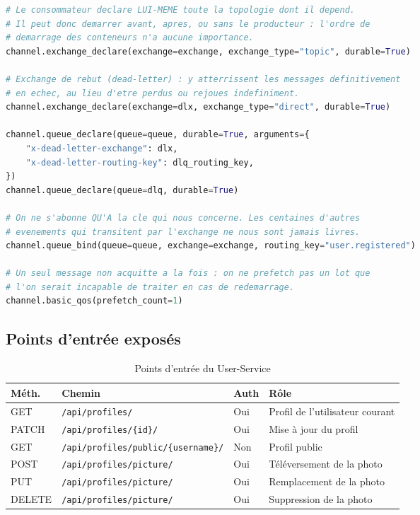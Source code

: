 \documentclass[11pt,a4paper,oneside]{report}
\newcommand{\code}[1]{\texttt{\small #1}}
\begin{document}
\begin{lstlisting}[language=Python, caption={\code{profiles/management/commands/consume\_events.py} — déclaration de la topologie et du rebut}]
# Le consommateur declare LUI-MEME toute la topologie dont il depend.
# Il peut donc demarrer avant, apres, ou sans le producteur : l'ordre de
# demarrage des conteneurs n'a aucune importance.
channel.exchange_declare(exchange=exchange, exchange_type="topic", durable=True)

# Exchange de rebut (dead-letter) : y atterrissent les messages definitivement
# en echec, au lieu d'etre perdus ou rejoues indefiniment.
channel.exchange_declare(exchange=dlx, exchange_type="direct", durable=True)

channel.queue_declare(queue=queue, durable=True, arguments={
    "x-dead-letter-exchange": dlx,
    "x-dead-letter-routing-key": dlq_routing_key,
})
channel.queue_declare(queue=dlq, durable=True)

# On ne s'abonne QU'A la cle qui nous concerne. Les centaines d'autres
# evenements qui transitent par l'exchange ne nous sont jamais livres.
channel.queue_bind(queue=queue, exchange=exchange, routing_key="user.registered")

# Un seul message non acquitte a la fois : on ne prefetch pas un lot que
# l'on serait incapable de traiter en cas de redemarrage.
channel.basic_qos(prefetch_count=1)
\end{lstlisting}

\subsection{Points d'entrée exposés}

\begin{table}[H]
\centering
\small
\begin{tabularx}{\linewidth}{@{}p{1.5cm}p{5.4cm}p{1.2cm}X@{}}
\toprule
\textbf{Méth.} & \textbf{Chemin} & \textbf{Auth} & \textbf{Rôle} \\
\midrule
GET & \code{/api/profiles/} & Oui & Profil de l'utilisateur courant \\
PATCH & \code{/api/profiles/\{id\}/} & Oui & Mise à jour du profil \\
GET & \code{/api/profiles/public/\{username\}/} & Non & Profil public \\
POST & \code{/api/profiles/picture/} & Oui & Téléversement de la photo \\
PUT & \code{/api/profiles/picture/} & Oui & Remplacement de la photo \\
DELETE & \code{/api/profiles/picture/} & Oui & Suppression de la photo \\
\bottomrule
\end{tabularx}
\caption{Points d'entrée du User-Service}
\end{table}
\end{document}

